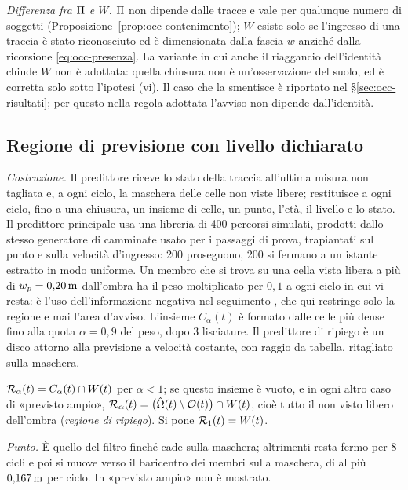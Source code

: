 \emph{Differenza fra $\Pi$ e $W$.} $\Pi$ non dipende dalle tracce e vale per qualunque numero di soggetti (Proposizione~\ref{prop:occ-contenimento}); $W$ esiste solo se l'ingresso di una traccia è stato riconosciuto ed è dimensionata dalla fascia $w$ anziché dalla ricorsione \eqref{eq:occ-presenza}. La variante in cui anche il riaggancio dell'identità chiude $W$ non è adottata: quella chiusura non è un'osservazione del suolo, ed è corretta solo sotto l'ipotesi (vi). Il caso che la smentisce è riportato nel \S\ref{sec:occ-risultati}; per questo nella regola adottata l'avviso non dipende dall'identità.

\subsection{Regione di previsione con livello dichiarato}\label{sec:occ-regione}

\emph{Costruzione.} Il predittore riceve lo stato della traccia all'ultima misura non tagliata e, a ogni ciclo, la maschera delle celle non viste libere; restituisce a ogni ciclo, fino a una chiusura, un insieme di celle, un punto, l'età, il livello e lo stato. Il predittore principale usa una libreria di 400 percorsi simulati, prodotti dallo stesso generatore di camminate usato per i passaggi di prova, trapiantati sul punto e sulla velocità d'ingresso: 200 proseguono, 200 si fermano a un istante estratto in modo uniforme. Un membro che si trova su una cella vista libera a più di $w_p=0{,}20\,\mathrm{m}$ dall'ombra ha il peso moltiplicato per $0{,}1$ a ogni ciclo in cui vi resta: è l'uso dell'informazione negativa nel seguimento \cite{koch2007,wyffels2015}, che qui restringe solo la regione e mai l'area d'avviso. L'insieme $C_\alpha(t)$ è formato dalle celle più dense fino alla quota $\alpha=0{,}9$ del peso, dopo 3 lisciature. Il predittore di ripiego è un disco attorno alla previsione a velocità costante, con raggio da tabella, ritagliato sulla maschera.

\begin{definizione}\label{def:occ-regione}
$\mathcal{R}_\alpha(t)=C_\alpha(t)\cap W(t)$ per $\alpha<1$; se questo insieme è vuoto, e in ogni altro caso di «previsto ampio», $\mathcal{R}_\alpha(t)=\bigl(\hat{\Omega}(t)\setminus\mathcal{O}(t)\bigr)\cap W(t)$, cioè tutto il non visto libero dell'ombra (\emph{regione di ripiego}). Si pone $\mathcal{R}_1(t)=W(t)$.
\end{definizione}

\emph{Punto.} È quello del filtro finché cade sulla maschera; altrimenti resta fermo per 8 cicli e poi si muove verso il baricentro dei membri sulla maschera, di al più $0{,}167\,\mathrm{m}$ per ciclo. In «previsto ampio» non è mostrato.


